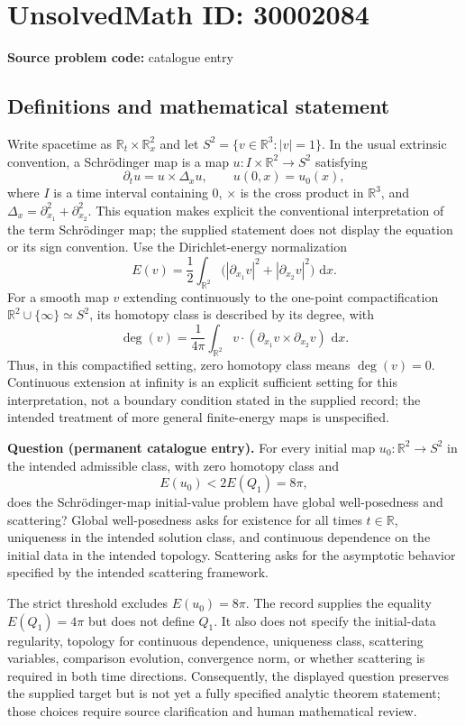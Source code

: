 \documentclass[11pt]{article}
\newcommand{\R}{\mathbb{R}}
\newcommand{\dd}{\,\mathrm{d}}
\begin{document}
\section*{UnsolvedMath ID: 30002084}
\textbf{Source problem code:} catalogue entry
\subsection{Definitions and mathematical statement}
Write spacetime as $\R_t\times\R_x^2$ and let $S^2=\{v\in\R^3:|v|=1\}$. In the usual extrinsic convention, a Schrödinger map is a map $u:I\times\R^2\to S^2$ satisfying
\[
\partial_tu=u\times\Delta_xu,\qquad u(0,x)=u_0(x),
\]
where $I$ is a time interval containing $0$, $\times$ is the cross product in $\R^3$, and $\Delta_x=\partial_{x_1}^2+\partial_{x_2}^2$. This equation makes explicit the conventional interpretation of the term Schrödinger map; the supplied statement does not display the equation or its sign convention. Use the Dirichlet-energy normalization
\[
E(v)=\frac12\int_{\R^2}\bigl(|\partial_{x_1}v|^2+|\partial_{x_2}v|^2\bigr)\,\dd x.
\]
For a smooth map $v$ extending continuously to the one-point compactification $\R^2\cup\{\infty\}\simeq S^2$, its homotopy class is described by its degree, with
\[
\deg(v)=\frac{1}{4\pi}\int_{\R^2}v\cdot(\partial_{x_1}v\times\partial_{x_2}v)\,\dd x.
\]
Thus, in this compactified setting, zero homotopy class means $\deg(v)=0$. Continuous extension at infinity is an explicit sufficient setting for this interpretation, not a boundary condition stated in the supplied record; the intended treatment of more general finite-energy maps is unspecified.

\textbf{Question (permanent catalogue entry).} For every initial map $u_0:\R^2\to S^2$ in the intended admissible class, with zero homotopy class and
\[
E(u_0)<2E(Q_1)=8\pi,
\]
does the Schrödinger-map initial-value problem have global well-posedness and scattering? Global well-posedness asks for existence for all times $t\in\R$, uniqueness in the intended solution class, and continuous dependence on the initial data in the intended topology. Scattering asks for the asymptotic behavior specified by the intended scattering framework.

The strict threshold excludes $E(u_0)=8\pi$. The record supplies the equality $E(Q_1)=4\pi$ but does not define $Q_1$. It also does not specify the initial-data regularity, topology for continuous dependence, uniqueness class, scattering variables, comparison evolution, convergence norm, or whether scattering is required in both time directions. Consequently, the displayed question preserves the supplied target but is not yet a fully specified analytic theorem statement; those choices require source clarification and human mathematical review.
\end{document}
